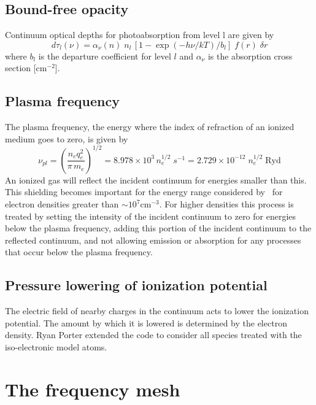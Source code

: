 \subsection{Bound-free opacity}

Continuum optical depths for photoabsorption from level l are given by
\begin{equation}
d{\tau _l}\left( \nu  \right) = {\alpha _\nu }\left( n
\right)\;{n_l}\,\left[ {1 - \exp \left( { - h\nu /kT} \right)/{b_l}}
\right]\;f(r)\;\delta r%
\end{equation}
where $b_l$ is the departure coefficient for level $l$ and $\alpha _\nu$ is the absorption
cross section [cm$^{-2}$].

\subsection{Plasma frequency}

The plasma frequency, the energy where the index of refraction of an
ionized medium goes to zero, is given by
\begin{equation}
{\nu _{pl}} = {\left( {\frac{{{n_e}q_e^2}}{{\pi \,{m_e}}}} \right)^{1/2}}
= 8.978 \times {10^3}\,n_e^{1/2}\;{s^{ - 1}} = 2.729 \times {10^{ -
12}}\;n_e^{1/2}\;{\mathrm{Ryd}}%
\end{equation}
An ionized gas will reflect the incident continuum for energies smaller
than this.  This shielding becomes important for the energy range considered
by \Cloudy\ for electron densities greater than $\sim 10^7 \mathrm{cm}^{-3}$.  For higher densities
this process is treated by setting the intensity of the incident continuum
to zero for energies below the plasma frequency, adding this portion of
the incident continuum to the reflected continuum, and not allowing emission
or absorption for any processes that occur below the plasma frequency.

\subsection{Pressure lowering of ionization potential}

The electric field of nearby charges in the continuum acts to lower the
ionization potential.  The amount by which it is lowered is determined by
the electron density.
Ryan Porter extended the code to consider all species
treated with the iso-electronic model atoms.

\section{The frequency mesh}

